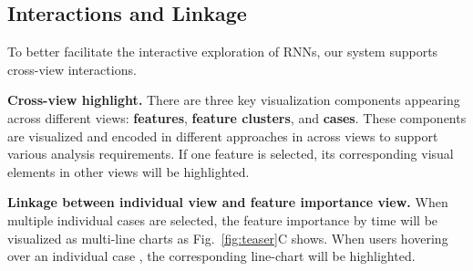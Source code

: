 \subsection{Interactions and Linkage}
To better facilitate the interactive exploration of RNNs, our system supports cross-view interactions. 

\textbf{Cross-view highlight.} 
There are three key visualization components appearing across different views: \textbf{features}, \textbf{feature clusters}, and \textbf{cases}. 
These components are visualized and encoded in different approaches in across views to support various analysis requirements. 
If one feature is selected, its corresponding visual elements in other views will be highlighted.


\textbf{Linkage between individual view and feature importance view.} 
When multiple individual cases are selected, the feature importance by time will be visualized as multi-line charts as Fig.~\ref{fig:teaser}C shows. 
When users hovering over an individual case , the corresponding line-chart will be highlighted. 


